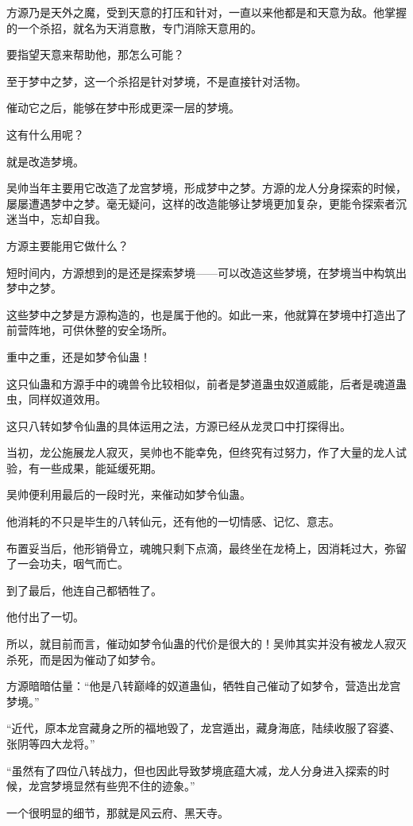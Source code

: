 \begin{this_body}
方源乃是天外之魔，受到天意的打压和针对，一直以来他都是和天意为敌。他掌握的一个杀招，就名为天消意散，专门消除天意用的。

要指望天意来帮助他，那怎么可能？

至于梦中之梦，这一个杀招是针对梦境，不是直接针对活物。

催动它之后，能够在梦中形成更深一层的梦境。

这有什么用呢？

就是改造梦境。

吴帅当年主要用它改造了龙宫梦境，形成梦中之梦。方源的龙人分身探索的时候，屡屡遭遇梦中之梦。毫无疑问，这样的改造能够让梦境更加复杂，更能令探索者沉迷当中，忘却自我。

方源主要能用它做什么？

短时间内，方源想到的是还是探索梦境——可以改造这些梦境，在梦境当中构筑出梦中之梦。

这些梦中之梦是方源构造的，也是属于他的。如此一来，他就算在梦境中打造出了前营阵地，可供休整的安全场所。

重中之重，还是如梦令仙蛊！

这只仙蛊和方源手中的魂兽令比较相似，前者是梦道蛊虫奴道威能，后者是魂道蛊虫，同样奴道效用。

这只八转如梦令仙蛊的具体运用之法，方源已经从龙灵口中打探得出。

当初，龙公施展龙人寂灭，吴帅也不能幸免，但终究有过努力，作了大量的龙人试验，有一些成果，能延缓死期。

吴帅便利用最后的一段时光，来催动如梦令仙蛊。

他消耗的不只是毕生的八转仙元，还有他的一切情感、记忆、意志。

布置妥当后，他形销骨立，魂魄只剩下点滴，最终坐在龙椅上，因消耗过大，弥留了一会功夫，咽气而亡。

到了最后，他连自己都牺牲了。

他付出了一切。

所以，就目前而言，催动如梦令仙蛊的代价是很大的！吴帅其实并没有被龙人寂灭杀死，而是因为催动了如梦令。

方源暗暗估量：“他是八转巅峰的奴道蛊仙，牺牲自己催动了如梦令，营造出龙宫梦境。”

“近代，原本龙宫藏身之所的福地毁了，龙宫遁出，藏身海底，陆续收服了容婆、张阴等四大龙将。”

“虽然有了四位八转战力，但也因此导致梦境底蕴大减，龙人分身进入探索的时候，龙宫梦境显然有些兜不住的迹象。”

一个很明显的细节，那就是风云府、黑天寺。


\end{this_body}
